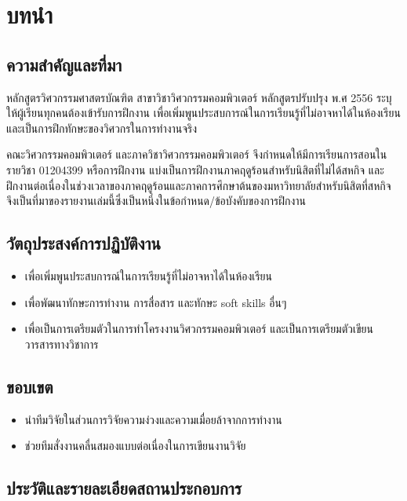 \documentclass[16pt,a4]{internshipreport}
\begin{document}
\tableofcontents

\listoffigures

\listoftables

\chapter{บทนำ}

\section{ความสำคัญและที่มา}
หลักสูตรวิศวกรรมศาสตรบัณฑิต สาขาวิชาวิศวกรรมคอมพิวเตอร์ หลักสูตรปรับปรุง พ.ศ 2556 ระบุให้ผู้เรียนทุกคนต้องเข้ารับการฝึกงาน เพื่อเพิ่มพูนประสบการณ์ในการเรียนรู้ที่ไม่อาจหาได้ในห้องเรียน และเป็นการฝึกทักษะของวิศวกรในการทำงานจริง

คณะวิศวกรรมคอมพิวเตอร์ และภาควิชาวิศวกรรมคอมพิวเตอร์ จึงกำหนดให้มีการเรียนการสอนในรายวิชา 01204399 หรือการฝึกงาน แบ่งเป็นการฝึกงานภาคฤดูร้อนสำหรับนิสิตที่ไม่ได้สหกิจ และฝึกงานต่อเนื่องในช่วงเวลาของภาคฤดูร้อนและภาคการศึกษาต้นของมหาวิทยาลัยสำหรับนิสิตที่สหกิจ จึงเป็นที่มาของรายงานเล่มนี้ซึ่งเป็นหนึ่งในข้อกำหนด/ข้อบังคับของการฝึกงาน

\section{วัตถุประสงค์การปฏิบัติงาน}
\begin{itemize}
    \item เพื่อเพิ่มพูนประสบการณ์ในการเรียนรู้ที่ไม่อาจหาได้ในห้องเรียน
    \item เพื่อพัฒนาทักษะการทำงาน การสื่อสาร และทักษะ soft skills อื่นๆ
    \item เพื่อเป็นการเตรียมตัวในการทำโครงงานวิศวกรรมคอมพิวเตอร์ และเป็นการเตรียมตัวเขียนวารสารทางวิชาการ
\end{itemize}

\section{ขอบเขต}
\begin{itemize}
    \item นำทีมวิจัยในส่วนการวิจัยความง่วงและความเมื่อยล้าจากการทำงาน
    \item ช่วยทีมสั่งงานคลื่นสมองแบบต่อเนื่องในการเขียนงานวิจัย
\end{itemize}

\section{ประวัติและรายละเอียดสถานประกอบการ}
\end{document}
